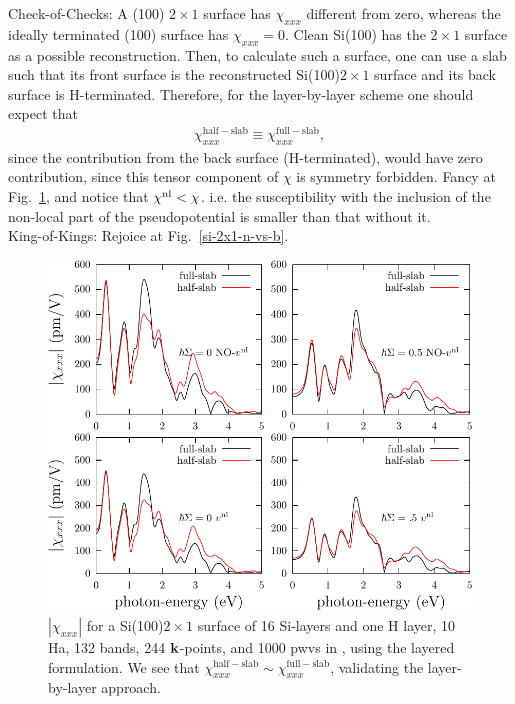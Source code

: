 Check-of-Checks: 
A (100) $2\times 1$ surface has $\chi_{xxx}$
 different from zero,
whereas the ideally terminated (100) surface has $\chi_{xxx}=0$.
Clean Si(100) has the $2\times 1$ surface as a possible
reconstruction. Then, to calculate such a surface, one can use
a slab such that its front surface is the reconstructed 
Si(100)$2\times 1$ surface and its back surface is H-terminated.
Therefore,
 for the
layer-by-layer scheme one should expect that
\begin{align}\label{cc3}
\chi^{\mathrm{half-slab}}_{xxx}
\equiv
\chi^{\mathrm{full-slab}}_{xxx}
,
\end{align}
since the contribution from the back surface (H-terminated), would
have zero contribution, since this tensor component of $\chi$ is
symmetry forbidden. Fancy at
Fig.~\ref{si-2x1}, and notice that $\chi^{\mathrm{nl}}<\chi$. i.e. the
susceptibility with the inclusion of the non-local part of the
pseudopotential is smaller than that without it.\\
King-of-Kings: Rejoice at 
Fig.~\ref{si-2x1-n-vs-b}.
\begin{figure}[b]
\centering 
\includegraphics[scale=.7]{plots/shg-si-2x1-16}
\caption{$|\chi_{xxx}|$ 
for a Si(100)$2\times 1$ surface of 16 Si-layers and one H layer, 10 
Ha, 132 bands,  244 $\mathbf{k}$-points, and 1000 pwvs in \depe,
 using 
the layered formulation. We see that 
$\chi^{\mathrm{half-slab}}_{xxx}
\sim 
\chi^{\mathrm{full-slab}}_{xxx}$,
validating the layer-by-layer approach. 
}
\label{si-2x1}
\end{figure}
